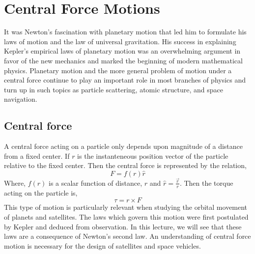 \chapter{Central Force Motions}
It was Newton's fascination with planetary motion that led him to formulate his laws of motion and the law of universal gravitation. His success in explaining Kepler's empirical laws of planetary motion was an overwhelming argument in favor of the new mechanics and marked the beginning of modern mathematical physics. Planetary motion and the more general problem of motion under a central force continue to play an important role in most branches of physics and turn up in such topics as particle scattering, atomic structure, and space navigation.
\section{Central force}
A central force  acting on a particle only depends upon magnitude of a distance from a fixed center. If $r$ is the instanteneous position vector of the particle relative to the fixed center. Then the central force is represented by the relation,
\begin{equation}
F= f(r) \hat{r}
\end{equation}
Where, $f(r)$ is a scalar function of distance, $r$  and $\hat{r}=\frac{\vec{r}}{r}$. Then the torque acting on the particle is,
\begin{equation}
\tau =r\times F
\end{equation}
This type of motion is particularly relevant when studying the orbital movement of planets and satellites. The laws which govern this motion were first postulated by Kepler and deduced from observation. In this lecture, we will see that these laws are a consequence of Newton's second law. An understanding of central force motion is necessary for the design of satellites and space vehicles.
